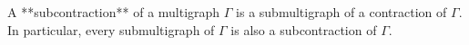A **subcontraction** of a multigraph $\Gamma$ is a submultigraph of a contraction of $\Gamma$. In particular, every submultigraph of $\Gamma$ is also a subcontraction of $\Gamma$.
